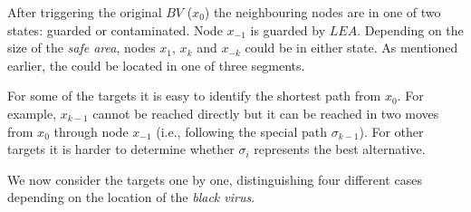 After triggering the original $BV$ ($x_{0}$) the neighbouring nodes are in one of two states: guarded or contaminated.
Node $x_{-1}$ is guarded by $LEA$. Depending on the size of the {\it safe area}, nodes $x_{1}$, $x_{k}$ and $x_{-k}$ could be in either state.
As mentioned earlier, the \bv could be located in one of three segments.

 For some of the targets it is easy to identify the shortest path from $x_0$. For example,   $x_{k-1}$  cannot be reached directly but  it can  be reached in two moves from $x_0$  through node $x_{-1}$ (i.e.,  following the special path $\sigma_{k-1}$). For other targets  it is harder to determine whether $\sigma_i$ represents the best alternative.

%
We now  consider the targets one by one,  distinguishing  four different  cases depending on the location of the {\it black virus}. 

